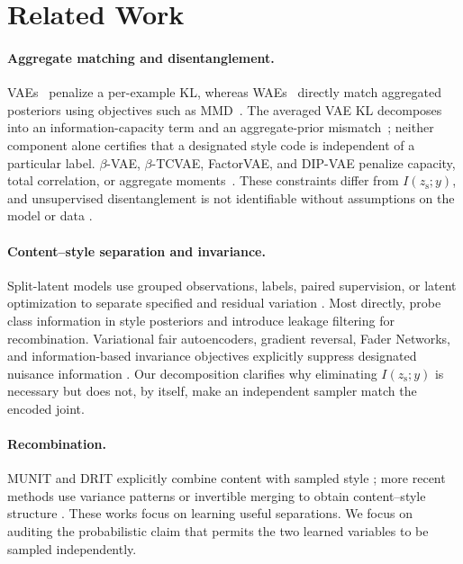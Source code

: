 \documentclass{article}
\newcommand{\zs}{z_{\mathrm{s}}}
\begin{document}
\section{Related Work}
\label{sec:related}

\paragraph{Aggregate matching and disentanglement.}
VAEs~\citep{kingma2013autoencoding} penalize a per-example KL, whereas
WAEs~\citep{tolstikhin2017wasserstein} directly match aggregated posteriors
using objectives such as MMD~\citep{gretton2012kernel}.  The averaged VAE KL
decomposes into an information-capacity term and an aggregate-prior
mismatch~\citep{hoffman2016elbo}; neither component alone certifies that a
designated style code is independent of a particular label.  $\beta$-VAE,
$\beta$-TCVAE, FactorVAE, and DIP-VAE penalize capacity, total correlation, or
aggregate moments~\citep{higgins2017beta,chen2018isolating,kim2018disentangling,kumar2018dipvae}.
These constraints differ from $I(\zs;y)$, and unsupervised disentanglement is
not identifiable without assumptions on the model or data
\citep{locatello2019challenging}.

\paragraph{Content--style separation and invariance.}
Split-latent models use grouped observations, labels, paired supervision, or
latent optimization to separate specified and residual variation
\citep{mathieu2016disentangling,bouchacourt2018multilevel,jha2018cycle,ilse2020diva,gabbay2020lord}.
Most directly, \citet{ridgeway2018leakage} probe class information in style
posteriors and introduce leakage filtering for recombination.  Variational
fair autoencoders, gradient reversal, Fader Networks, and information-based
invariance objectives explicitly suppress designated nuisance information
\citep{louizos2015variational,ganin2015unsupervised,lample2017fader,moyer2018invariant}.
Our decomposition clarifies why eliminating $I(\zs;y)$ is necessary but does
not, by itself, make an independent sampler match the encoded joint.

\paragraph{Recombination.}
MUNIT and DRIT explicitly combine content with sampled style
\citep{huang2018munit,lee2018drit}; more recent methods use variance patterns
or invertible merging to obtain content--style structure
\citep{wu2025variance,ma2025scflow}.  These works focus on learning useful
separations.  We focus on auditing the probabilistic claim that permits the
two learned variables to be sampled independently.
\end{document}
